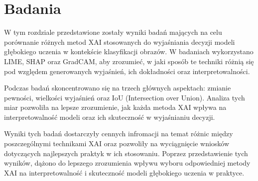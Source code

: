 
\chapter*{Badania}

W tym rozdziale przedstawione zostały wyniki badań mających na celu porównanie różnych metod XAI stosowanych do wyjaśniania decyzji modeli głębokiego uczenia w kontekście klasyfikacji obrazów.
W badaniach wykorzystano LIME, SHAP oraz GradCAM, aby zrozumieć, w jaki sposób te techniki różnią się pod względem generowanych wyjaśnień, ich dokładności oraz interpretowalności.

Podczas badań skoncentrowano się na trzech głównych aspektach: zmianie pewności, wielkości wyjaśnień oraz IoU (Intersection over Union).
Analiza tych miar pozwoliła na lepsze zrozumienie, jak każda metoda XAI wpływa na interpretowalność modeli oraz ich skuteczność w wyjaśnianiu decyzji.

Wyniki tych badań dostarczyły cennych infromacji na temat różnic między poszczególnymi technikami XAI oraz pozwoliły na wyciągnięcie wniosków dotyczących najlepszych praktyk w ich stosowaniu.
Poprzez przedstawienie tych wyników, dążono do lepszego zrozumienia wpływu wyboru odpowiedniej metody XAI na interpretowalność i skuteczność modeli głębokiego uczenia w praktyce.









%

%


